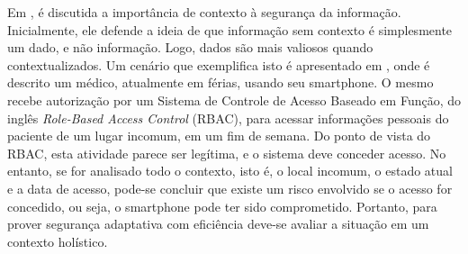 \documentclass[tid,table]{texufpel} %
\begin{document}
Em \cite{heimerl12},  é discutida a importância de contexto à segurança da informação. Inicialmente, ele defende a ideia de que informação sem contexto é simplesmente um dado, e não informação. Logo, dados são mais valiosos quando contextualizados.  Um cenário que exemplifica isto é apresentado em \cite{aman15}, onde é descrito um médico, atualmente em férias, usando seu smartphone. O mesmo recebe autorização por um Sistema de Controle de Acesso Baseado em Função, do inglês \textit{Role-Based Access Control} (RBAC), para acessar informações pessoais do paciente de um lugar incomum, em um fim de semana. Do ponto de vista do RBAC, esta atividade parece ser legítima, e o sistema deve conceder acesso. No entanto, se for analisado todo o contexto, isto é, o local incomum, o estado atual e a data de acesso, pode-se concluir que existe um risco envolvido se o acesso for concedido, ou seja, o smartphone pode ter sido comprometido. Portanto, para prover segurança adaptativa com eficiência deve-se avaliar a situação em um contexto holístico.


\end{document}
